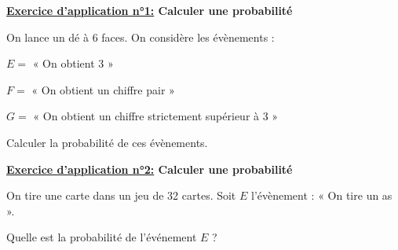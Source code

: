 \documentclass[12pt]{article}
\begin{document}
\vspace{5pt}

\begin{mdframed}[
    linewidth=1pt,
    roundcorner=5pt,
    linecolor=RoyalBlue,
    innertopmargin=10pt,
    innerbottommargin=10pt
]
{\color{RoyalBlue}
\textbf{\underline{Exercice d'application n°1:} Calculer une probabilité}}

\vspace{5pt}
On lance un dé à 6 faces. On considère les évènements :

\vspace{5pt}
$E=$ « On obtient 3 »

\vspace{5pt}
$F=$ « On obtient un chiffre pair »

\vspace{5pt}
$G=$ « On obtient un chiffre strictement supérieur à 3 »

\vspace{5pt}
Calculer la probabilité de ces évènements.

\vspace{0.5cm}
{\color{black!30}\dotfill}

\vspace{0.5cm}
{\color{black!30}\dotfill}

\vspace{0.5cm}
{\color{black!30}\dotfill}

\vspace{0.5cm}
{\color{black!30}\dotfill}

\vspace{0.5cm}
{\color{black!30}\dotfill}

\vspace{20pt}

{\color{RoyalBlue}
\textbf{\underline{Exercice d'application n°2:} Calculer une probabilité}}

\vspace{5pt}
On tire une carte dans un jeu de 32 cartes. Soit $E$ l’évènement : « On tire un as ».

\vspace{5pt}
Quelle est la probabilité de l’événement $E$ ?

\vspace{0.5cm}
{\color{black!30}\dotfill}

\vspace{0.5cm}
{\color{black!30}\dotfill}

\vspace{0.5cm}
{\color{black!30}\dotfill}

\vspace{20pt}

\end{mdframed}
\end{document}

